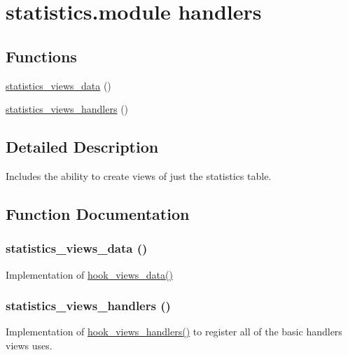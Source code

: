 \hypertarget{group__views__statistics__module}{
\section{statistics.module handlers}
\label{group__views__statistics__module}
}
\subsection*{Functions}
\begin{CompactItemize}
\item 
\hyperlink{group__views__statistics__module_g9300ca230bb34c089e59aa4c0ff3e1dc}{statistics\_\-views\_\-data} ()
\item 
\hyperlink{group__views__statistics__module_g0f99562f2c2af4067356add59238b906}{statistics\_\-views\_\-handlers} ()
\end{CompactItemize}


\subsection{Detailed Description}
Includes the ability to create views of just the statistics table. 

\subsection{Function Documentation}
\hypertarget{group__views__statistics__module_g9300ca230bb34c089e59aa4c0ff3e1dc}{
\subsubsection[{statistics\_\-views\_\-data}]{\setlength{\rightskip}{0pt plus 5cm}statistics\_\-views\_\-data ()}}
\label{group__views__statistics__module_g9300ca230bb34c089e59aa4c0ff3e1dc}


Implementation of \hyperlink{group__views__hooks_g227057901681e4a33e33c199c7a8c989}{hook\_\-views\_\-data()} \hypertarget{group__views__statistics__module_g0f99562f2c2af4067356add59238b906}{
\subsubsection[{statistics\_\-views\_\-handlers}]{\setlength{\rightskip}{0pt plus 5cm}statistics\_\-views\_\-handlers ()}}
\label{group__views__statistics__module_g0f99562f2c2af4067356add59238b906}


Implementation of \hyperlink{group__views__hooks_gbf506f44bd8d8a86876f27396f5341ed}{hook\_\-views\_\-handlers()} to register all of the basic handlers views uses. 